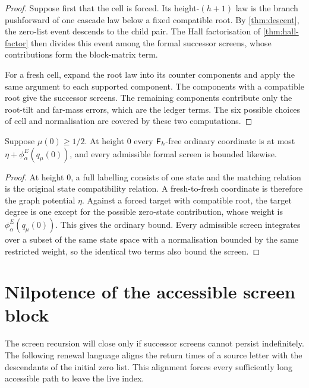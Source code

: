 \begin{proof}
\leanok
{}
Suppose first that the cell is forced. Its height-$(h+1)$ law is the branch pushforward of one
cascade law below a fixed compatible root. By \cref{thm:descent}, the zero-list event descends to
the child pair. The Hall factorisation of \cref{thm:hall-factor} then divides this event among the
formal successor screens, whose contributions form the block-matrix term.

For a fresh cell, expand the root law into its counter components and apply the same argument to
each supported component. The components with a compatible root give the successor screens. The
remaining components contribute only the root-tilt and far-mass errors, which are the ledger
terms. The six possible choices of cell and normalisation are covered by these two computations.
\end{proof}

\begin{lemma}
\label{thm:base}
\leanok
{}
Suppose $\mu(0)\geq1/2$. At height $0$ every $\mathsf{F}_k$-free ordinary coordinate is at most
$\eta+\phi^E_\alpha(q_\mu(0))$, and every admissible formal screen is bounded likewise.
\end{lemma}

\begin{proof}
\leanok
{}
At height $0$, a full labelling consists of one state and the matching relation is the original
state compatibility relation. A fresh-to-fresh coordinate is therefore the graph potential
$\eta$. Against a forced target with compatible root, the target degree is one except for the
possible zero-state contribution, whose weight is $\phi^E_\alpha(q_\mu(0))$. This gives the
ordinary bound. Every admissible screen integrates over a subset of the same state space with a
normalisation bounded by the same restricted weight, so the identical two terms also bound the
screen.
\end{proof}

\section{Nilpotence of the accessible screen block}

The screen recursion will close only if successor screens cannot persist indefinitely. The
following renewal language aligns the return times of a source letter with the descendants of the
initial zero list. This alignment forces every sufficiently long accessible path to leave the live
index.

